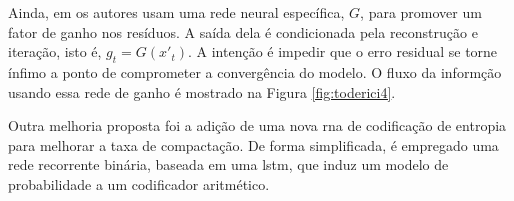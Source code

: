 
 Ainda, em \cite{FullResolution2017Toderici} os autores usam uma rede neural específica, $G$,  para promover um fator de ganho nos resíduos. A saída dela é condicionada pela reconstrução e iteração, isto é, $g_t = G(x'_t)$. A intenção é impedir que o erro residual se torne ínfimo a ponto de comprometer a convergência do modelo. O fluxo da informção usando essa rede de ganho é mostrado na Figura \ref{fig:toderici4}.

Outra melhoria proposta foi a adição de uma nova \acrshort{rna} de codificação de entropia para melhorar a taxa de compactação. De forma simplificada, é empregado uma rede recorrente binária, baseada em uma \acrshort{lstm}, que induz um modelo de probabilidade a um codificador aritmético.









